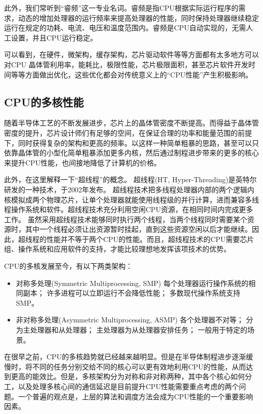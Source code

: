 \documentclass[final]{cvpr}
\begin{document}
此外，我们常听到“睿频”这一专业名词。睿频是指CPU根据实际运行程序的需求，动态的增加处理器的运行频率来提高处理器的性能，同时保持处理器继续稳定运行在规定的功耗、电流、电压和温度范围内。睿频是CPU自动实现的，无需人工设置，并且CPU运行稳定。

可以看到，在硬件，微架构，缓存架构，芯片驱动软件等等方面都有太多地方可以对CPU 晶体管利用率，能耗比，极限性能，芯片极限面积，甚至芯片软件开发时间等等方面做出优化，这些优化都会对传统意义上的“CPU性能”产生积极影响。\cite{Web/zhihu1}

\subsection{\textbf{CPU的多核性能}}

随着半导体工艺的不断发展进步，芯片上的晶体管密度不断提高。而得益于晶体管密度的提升，芯片设计师们有足够的空间，在保证合理的功率和能量范围的前提下，同时获得复杂的架构和更高的频率。以这样一种简单粗暴的思路，甚至可以只依靠晶体管的小型化简单粗暴添加更多内核，然后通过制程进步带来的更多的核心来提升CPU性能，也间接地降低了计算机的价格。

此外，在这里解释一下“超线程”的概念。
超线程(HT, Hyper-Threading)是英特尔研发的一种技术，于2002年发布。
超线程技术把多线程处理器内部的两个逻辑内核模拟成两个物理芯片，让单个处理器就能使用线程级的并行计算，进而兼容多线程操作系统和软件。超线程技术充分利用空闲CPU资源，在相同时间内完成更多工作。 
虽然采用超线程技术能够同时执行两个线程，当两个线程同时需要某个资源时，其中一个线程必须让出资源暂时挂起，直到这些资源空闲以后才能继续。因此，超线程的性能并不等于两个CPU的性能。而且，超线程技术的CPU需要芯片组、操作系统和应用软件的支持，才能比较理想地发挥该项技术的优势。

CPU的多核发展至今，有以下两类架构：

\begin{itemize}
\item 对称多处理(Symmetric Multiprocessing, SMP)
\subitem 每个处理器运行操作系统的相同副本；
\subitem 许多进程可以立即运行不会降低性能；
\subitem 多数现代操作系统支持SMP。
\item 非对称多处理(Asymmetric Multiprocessing, ASMP)
\subitem 各个处理器不对等；
\subitem 分为主处理器和从处理器；
\subitem 主处理器为从处理器安排任务；
\subitem 一般用于特定的场景。\cite{os-book}
\end{itemize}

在很早之前，CPU的多核趋势就已经越来越明显。但是在半导体制程进步逐渐缓慢时，将不同的任务分别交给不同的核心可以更有效地利用CPU的性能，从而达到更高的能效比。但是，多核架构分为对称和非对称两种，其中各个核心如何分工，以及处理多核心间的通信延迟是目前提升CPU性能需要重点考虑的两个问题。一个普遍的观点是，上层的算法和调度方法会成为CPU性能的一个重要影响因素。\cite{Web/zhihu1}
\end{document}
